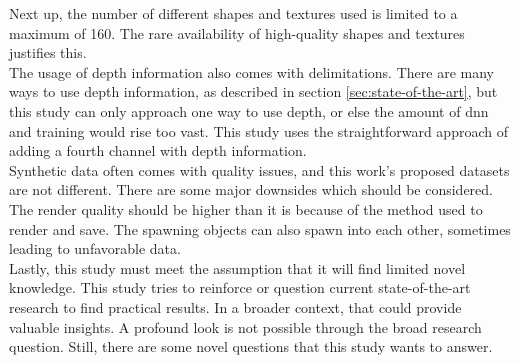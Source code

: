 		Next up, the number of different shapes and textures used is limited to a maximum of 160. The rare availability of high-quality shapes and textures justifies this.\\
		The usage of depth information also comes with delimitations. There are many ways to use depth information, as described in section \ref{sec:state-of-the-art}, but this study can only approach one way to use depth, or else the amount of \ac{dnn} and training would rise too vast. This study uses the straightforward approach of adding a fourth channel with depth information.\\
		Synthetic data often comes with quality issues, and this work's proposed datasets are not different. There are some major downsides which should be considered. The render quality should be higher than it is because of the method used to render and save. The spawning objects can also spawn into each other, sometimes leading to unfavorable data. \\
		Lastly, this study must meet the assumption that it will find limited novel knowledge. This study tries to reinforce or question current state-of-the-art research to find practical results. In a broader context, that could provide valuable insights. A profound look is not possible through the broad research question. Still, there are some novel questions that this study wants to answer.
	
	
	
